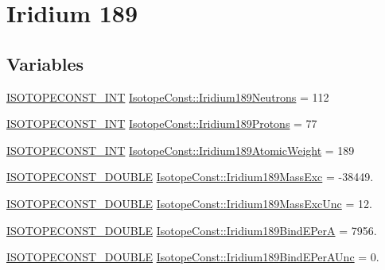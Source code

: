 \hypertarget{group___isotope_const-_iridium-_ir189}{}\section{Iridium 189}
\label{group___isotope_const-_iridium-_ir189}
\subsection*{Variables}
\begin{DoxyCompactItemize}
\item 
\mbox{\hyperlink{group___isotope_const-_macros_ga5f18360b3e99483a35c32d789e62621c}{I\+S\+O\+T\+O\+P\+E\+C\+O\+N\+S\+T\+\_\+\+I\+NT}} \mbox{\hyperlink{group___isotope_const-_iridium-_ir189_gaf51c975ea53630a077a577e189ebe29e}{Isotope\+Const\+::\+Iridium189\+Neutrons}} = 112
\item 
\mbox{\hyperlink{group___isotope_const-_macros_ga5f18360b3e99483a35c32d789e62621c}{I\+S\+O\+T\+O\+P\+E\+C\+O\+N\+S\+T\+\_\+\+I\+NT}} \mbox{\hyperlink{group___isotope_const-_iridium-_ir189_ga6d6fa92e3a2c3a111151f03d408d28df}{Isotope\+Const\+::\+Iridium189\+Protons}} = 77
\item 
\mbox{\hyperlink{group___isotope_const-_macros_ga5f18360b3e99483a35c32d789e62621c}{I\+S\+O\+T\+O\+P\+E\+C\+O\+N\+S\+T\+\_\+\+I\+NT}} \mbox{\hyperlink{group___isotope_const-_iridium-_ir189_ga661a9aeeb86e87ca9b3cca431e92bc45}{Isotope\+Const\+::\+Iridium189\+Atomic\+Weight}} = 189
\item 
\mbox{\hyperlink{group___isotope_const-_macros_ga8f45a7272ce02c0b4c65c44636ed719a}{I\+S\+O\+T\+O\+P\+E\+C\+O\+N\+S\+T\+\_\+\+D\+O\+U\+B\+LE}} \mbox{\hyperlink{group___isotope_const-_iridium-_ir189_ga21e0533f90b2c85d75321d50cc77636b}{Isotope\+Const\+::\+Iridium189\+Mass\+Exc}} = -\/38449.
\item 
\mbox{\hyperlink{group___isotope_const-_macros_ga8f45a7272ce02c0b4c65c44636ed719a}{I\+S\+O\+T\+O\+P\+E\+C\+O\+N\+S\+T\+\_\+\+D\+O\+U\+B\+LE}} \mbox{\hyperlink{group___isotope_const-_iridium-_ir189_ga46e3764fbaf4ea71c81f1b834f9c6839}{Isotope\+Const\+::\+Iridium189\+Mass\+Exc\+Unc}} = 12.
\item 
\mbox{\hyperlink{group___isotope_const-_macros_ga8f45a7272ce02c0b4c65c44636ed719a}{I\+S\+O\+T\+O\+P\+E\+C\+O\+N\+S\+T\+\_\+\+D\+O\+U\+B\+LE}} \mbox{\hyperlink{group___isotope_const-_iridium-_ir189_ga599bb1181fac58ce262d4af82a27d1d1}{Isotope\+Const\+::\+Iridium189\+Bind\+E\+PerA}} = 7956.
\item 
\mbox{\hyperlink{group___isotope_const-_macros_ga8f45a7272ce02c0b4c65c44636ed719a}{I\+S\+O\+T\+O\+P\+E\+C\+O\+N\+S\+T\+\_\+\+D\+O\+U\+B\+LE}} \mbox{\hyperlink{group___isotope_const-_iridium-_ir189_gafff85c53ce160a8241e946ae1fec0646}{Isotope\+Const\+::\+Iridium189\+Bind\+E\+Per\+A\+Unc}} = 0.

\end{DoxyCompactItemize}
